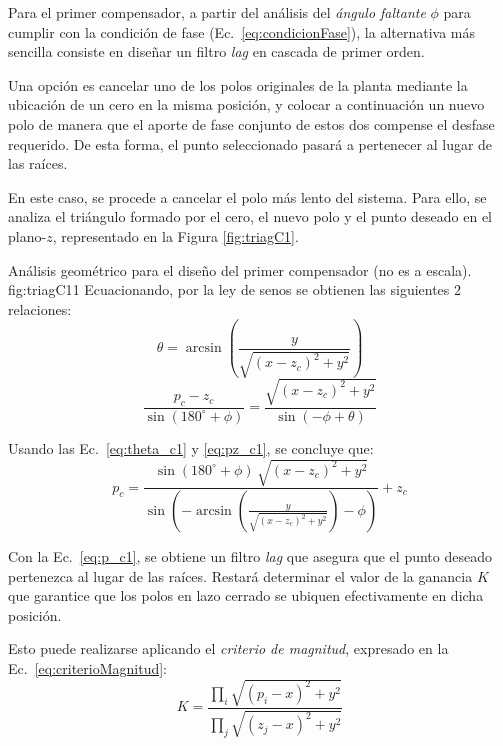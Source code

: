Para el primer compensador, a partir del an\'alisis del \emph{ángulo faltante} $\phi$ para cumplir con la condici\'on de fase (Ec.~\eqref{eq:condicionFase}), la alternativa m\'as sencilla consiste en dise\~nar un filtro \emph{lag} en cascada de primer orden.  

Una opci\'on es cancelar uno de los polos originales de la planta mediante la ubicaci\'on de un cero en la misma posici\'on, y colocar a continuaci\'on un nuevo polo de manera que el aporte de fase conjunto de estos dos compense el desfase requerido. De esta forma, el punto seleccionado pasar\'a a pertenecer al lugar de las ra\'ices.  

En este caso, se procede a cancelar el polo m\'as lento del sistema. Para ello, se analiza el tri\'angulo formado por el cero, el nuevo polo y el punto deseado en el plano-$z$, representado en la Figura \ref{fig:triagC1}.  

{Análisis geométrico para el diseño del primer compensador (no es a escala).}
{fig:triagC1}{1}
Ecuacionando, por la ley de senos se obtienen las siguientes 2 relaciones:  
\begin{equation}
	\theta = \arcsin\!\left(\frac{y}{\sqrt{(x-z_c)^2+y^2}}\right)
	\label{eq:theta_c1}
\end{equation}
\begin{equation}
	\frac{p_c - z_c}{\sin(180^\circ+\phi)} 
	= \frac{\sqrt{(x-z_c)^2+y^2}}{\sin(-\phi+\theta)}
	\label{eq:pz_c1}
\end{equation}

Usando las Ec.~\eqref{eq:theta_c1} y \eqref{eq:pz_c1}, se concluye que:  
\begin{equation}
	p_c = 
	\frac{\sin(180^\circ+\phi)\,\sqrt{(x-z_c)^2+y^2}}
	{\sin\!\left(-\arcsin\!\left(\tfrac{y}{\sqrt{(x-z_c)^2+y^2}}\right)-\phi\right)}
	+ z_c
	\label{eq:p_c1}
\end{equation}

Con la Ec.~\eqref{eq:p_c1}, se obtiene un filtro \emph{lag} que asegura que el punto deseado pertenezca al lugar de las ra\'ices. Restar\'a determinar el valor de la ganancia $K$ que garantice que los polos en lazo cerrado se ubiquen efectivamente en dicha posici\'on.  

Esto puede realizarse aplicando el \emph{criterio de magnitud}, expresado en la Ec.~\eqref{eq:criterioMagnitud}:  
\begin{equation}
	K = \frac{\prod_i \sqrt{(p_i-x)^2+y^2}}
	{\prod_j \sqrt{(z_j-x)^2+y^2}}
	\label{eq:criterioMagnitud}
\end{equation}

